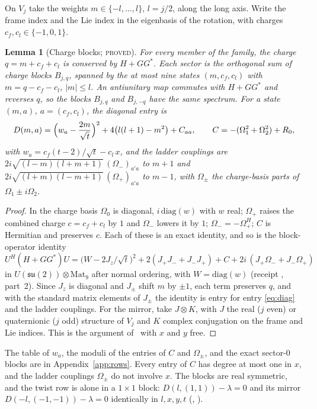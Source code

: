 \documentclass[11pt]{article}
\newtheorem{lemma}[theorem]{Lemma}
\theoremstyle{definition}
\theoremstyle{remark}
\newcommand{\su}{\mathfrak{su}(2)}
\newcommand{\PROVED}{\textsc{proved}}
\begin{document}
On $V_j$ take the weights $m\in\{-l,\dots,l\}$, $l=j/2$, along the long axis. Write the frame index and the Lie index in
the eigenbasis of the rotation, with charges $c_f,c_l\in\{-1,0,1\}$.

\begin{lemma}[Charge blocks; \PROVED]\label{lem:blocks}
For every member of the family, the charge $q=m+c_f+c_l$ is conserved by $H+GG^*$. Each sector is the orthogonal sum
of charge blocks $B_{j,q}$, spanned by the at most nine states $(m,c_f,c_l)$ with $m=q-c_f-c_l$, $|m|\le l$. An
antiunitary map commutes with $H+GG^*$ and reverses $q$, so the blocks $B_{j,q}$ and $B_{j,-q}$ have the same spectrum.
For a state $(m,a)$, $a=(c_f,c_l)$, the diagonal entry is
\begin{equation}\label{eq:diag}
  D(m,a)=\Bigl(w_a-\frac{2m}{\sqrt t}\Bigr)^2+4\bigl(l(l+1)-m^2\bigr)+C_{aa},\qquad C=-(\Omega_1^2+\Omega_2^2)+R_0,
\end{equation}
with $w_a=c_f(t-2)/\sqrt t-c_l\,x$, and the ladder couplings are $2i\sqrt{(l-m)(l+m+1)}\,(\Omega_-)_{a'a}$ to $m+1$ and
$2i\sqrt{(l+m)(l-m+1)}\,(\Omega_+)_{a'a}$ to $m-1$, with $\Omega_\pm$ the charge-basis parts of $\Omega_1\pm i\Omega_2$.
\end{lemma}
\begin{proof}
In the charge basis $\Omega_0$ is diagonal, $i\,\mathrm{diag}(w)$ with $w$ real; $\Omega_+$ raises the combined charge
$c=c_f+c_l$ by $1$ and $\Omega_-$ lowers it by $1$; $\Omega_-=-\Omega_+^{H}$; $C$ is Hermitian and preserves $c$. Each of
these is an exact identity, and so is the block-operator identity
\[
  U^H(H+GG^*)U=\bigl(W-2J_z/\sqrt t\bigr)^2+2(J_+J_-+J_-J_+)+C+2i\,(J_+\Omega_-+J_-\Omega_+)
\]
in $U(\su)\otimes\mathrm{Mat}_9$ after normal ordering, with $W=\mathrm{diag}(w)$ (receipt ,
part~2). Since $J_z$ is diagonal and $J_\pm$ shift $m$ by $\pm1$, each term preserves $q$, and with the standard matrix
elements of $J_\pm$ the identity is entry for entry \eqref{eq:diag} and the ladder couplings. For the mirror, take
$J\otimes K$, with $J$ the real ($j$ even) or quaternionic ($j$ odd) structure of $V_j$ and $K$ complex conjugation on
the frame and Lie indices. This is the argument of~\cite[Lemma ``Charge blocks'']{davisfloor2026} with $x$ and $y$ free.
\end{proof}

The table of $w_a$, the moduli of the entries of $C$ and $\Omega_\pm$, and the exact sector-$0$ blocks are in
Appendix~\ref{app:rows}. Every entry of $C$ has degree at most one in $x$, and the ladder couplings $\Omega_\pm$ do not
involve $x$. The blocks are real symmetric, and the twist row is alone in a $1\times1$ block: $D(l,(1,1))-\lambda=0$
and its mirror $D(-l,(-1,-1))-\lambda=0$ identically in $l,x,y,t$ (,
).
\end{document}
